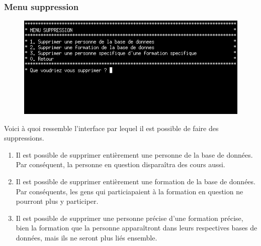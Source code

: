 \documentclass[11pt]{article}
\begin{document}
\newpage
\subsubsection{Menu suppression}
\begin{figure}[ht]
  \centering
  \includegraphics[trim=0 80 0 0, clip, width=\textwidth]{images/16.png}
\end{figure}

Voici à quoi ressemble l'interface par lequel il est possible de faire des suppressions.
\begin{enumerate}
\item Il est possible de supprimer entièrement une personne de la base de données. Par conséquent, la personne en question disparaîtra des cours aussi.
\item Il est possible de supprimer entièrement une formation de la base de données. Par conséquents, les gens qui particiapaient à la formation en question ne pourront plus y participer.
\item Il est possible de supprimer une personne précise d'une formation précise, bien la formation que la personne apparaîtront dans leurs respectives bases de données, mais ils ne seront plus liés ensemble.
\end{enumerate}
\end{document}
